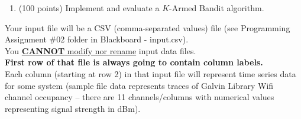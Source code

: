 \documentclass[
	type={Programming},
	assignment={2},
	points={100},
	duedate={Sunday, April 7, 2024, 11:59 CST},
	template=true,
]{cs581homework}
\begin{document}
\maketitle

\begin{objectives}
	\begin{enumerate}[label=\arabic*.]
		\item (100 points) Implement and evaluate a $K$-Armed Bandit algorithm.\\
	\end{enumerate}
\end{objectives}

\begin{inputdata}
	Your input file will be a CSV (comma-separated values) file (see Programming Assignment \#02 folder in Blackboard - input.csv).\\

	You \underline{\textbf{CANNOT} modify nor rename} input data files.\\

	\textbf{First row of that file is always going to contain column labels.}\\

	Each column (starting at row 2) in that input file will represent time series data for some system (sample file data represents traces of Galvin Library Wifi channel occupancy -- there are 11 channels/columns with numerical values representing signal strength in dBm).\\
\end{inputdata}

\deliverables
\end{document}
